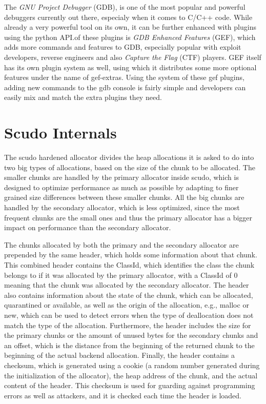 \documentclass[a4paper,11pt,oneside]{report}
\begin{document}
The \emph{GNU Project Debugger} (GDB), is one of the most popular and powerful
debuggers currently out there, especialy when it comes to C/C++ code. While
already a very powerful tool on its own, it can be further enhanced with
plugins using the python API.\@One of these plugins is \emph{GDB Enhanced Features}
(GEF), which adds more commands and features to GDB, especially popular with
exploit developers, reverse engineers and also \emph{Capture the Flag} (CTF)
players. GEF itself has its own plugin system as well, using which it distributes
some more optional features under the name of gef-extras. Using the system of
these gef plugins, adding new commands to the gdb console is fairly simple and
developers can easily mix and match the extra plugins they need.


\chapter{Scudo Internals}

The scudo hardened allocator divides the heap allocations it is asked to do into
two big types of allocations, based on the size of the chunk to be allocated.
The smaller chunks are handled by the primary allocator inside scudo, which is
designed to optimize performance as much as possible by adapting to finer grained
size differences between these smaller chunks. All the big chunks are handled by
the secondary allocator, which is less optimized, since the most frequent chunks
are the small ones and thus the primary allocator has a bigger impact on performance
than the secondary allocator.

The chunks allocated by both the primary and the secondary allocator are prepended
by the same header, which holds some information about that chunk. This combined
header contains the ClassId, which identifies the class the chunk belongs to if
it was allocated by the primary allocator, with a ClassId of 0 meaning that the
chunk was allocated by the secondary allocator. The header also contains information
about the state of the chunk, which can be allocated, quarantined or available, as
well as the origin of the allocation, e.g., malloc or new, which can be used to
detect errors when the type of deallocation does not match the type of the
allocation. Furthermore, the header includes the size for the primary chunks or
the amount of unused bytes for the secondary chunks and an offset, which is the
distance from the beginning of the returned chunk to the beginning of the actual
backend allocation. Finally, the header contains a checksum, which is generated
using a cookie (a random number generated during the initialization of the
allocator), the heap address of the chunk, and the actual content of the header.
This checksum is used for guarding against programming errors as well as attackers,
and it is checked each time the header is loaded.
\end{document}
